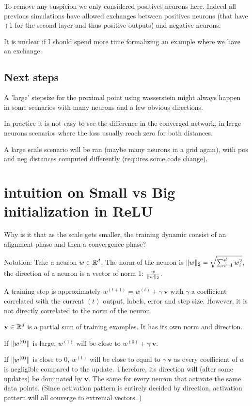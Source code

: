 To remove any suspicion we only considered positives neurons here. Indeed all previous simulations have allowed exchanges between positives neurons (that have +1 for the second layer and thus positive outputs) and negative neurons.

It is unclear if I should spend more time formalizing an example where we have an exchange.

\subsection{Next steps}

A 'large' stepsize for the proximal point using wasserstein might always happen in some scenarios with many neurons and a few obvious directions.

In practice it is not easy to see the difference in the converged network, in large neurons scenarios where the loss usually reach zero for both distances.

A large scale scenario will be ran (maybe many neurons in a grid again), with pos and neg distances computed differently (requires some code change).



\section{intuition on Small vs Big initialization in ReLU}

Why is it that as the scale gets smaller, the training dynamic consist of an alignment phase and then a convergence phase?

Notation: Take a neuron $w \in \mathbb{R}^d$. The norm of the neuron is $\lVert w\rVert_2 = \sqrt{\sum_{i=1}^{d} w_i^2}$, the direction of a neuron is a vector of norm $1$: $\frac{w}{\lVert w\rVert_2}$.

A training step is approximately $w^{(t+1)} = w^{(t)} + \gamma ~ \mathbf{v}$ with $\gamma$ a coefficient correlated with the current $(t)$ output, labels, error and step size. However, it is not directly correlated to the norm of the neuron.

$\mathbf{v} \in \mathbb{R}^d$ is a partial sum of training examples. It has its own norm and direction.

If $\lVert w^{(0)}\rVert$ is large, $w^{(1)}$ will be close to $w^{(0)} + \gamma ~ \mathbf{v}$.

If $\lVert w^{(0)}\rVert$ is close to 0, $w^{(1)}$ will be close to equal to $\gamma ~ \mathbf{v}$ as every coefficient of $w$ is negligible compared to the update. Therefore, its direction will (after some updates) be dominated by $\mathbf{v}$. The same for every neuron that activate the same data points. (Since activation pattern is entirely decided by direction, activation pattern will all converge to extremal vectors..)

